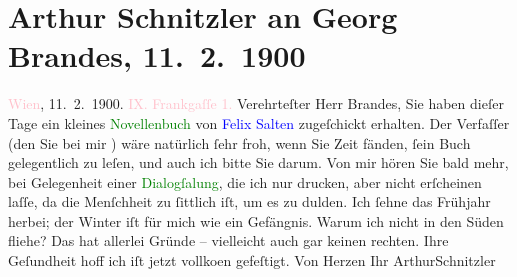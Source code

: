 

               \section[Arthur Schnitzler an Georg Brandes, 11. 2. 1900]{ Arthur Schnitzler an Georg Brandes, 11. 2. 1900}\nopagebreak{}\rehead{ }\normalsize\beginnumbering{} \toendnotes[C]{\smallbreak\pagebreak[2]} 
\toendnotes[C]{\smallbreak}\pstart
           \raggedleft{}{\pb}\textcolor{pink}{Wien}{}\ledrightnote{\textcolor{pink}{Wien}}, 11. 2. 1900.\pend
           \pstart
           \textcolor{pink}{IX. Frankgaſſe 1.}{}\ledrightnote{\textcolor{pink}{Frankgasse}}\pend
           \pstart
           Verehrteſter Herr Brandes, Sie haben dieſer Tage ein kleines
                        \textcolor{green}{Novellenbuch}{} von \textcolor{blue}{Felix Salten}{}\ledrightnote{\textcolor{blue}{Felix Salten}} zugeſchickt erhalten. Der
                    Verfaſſer (den Sie bei mir \label{K_L01012_1v}\label{K_L01012_1h}) wäre natürlich ſehr froh, wenn Sie Zeit fänden, ſein Buch gelegentlich
                    zu leſen, und auch ich bitte Sie darum.\pend
           \pstart
           Von mir hören Sie bald mehr, bei Gelegenheit einer {\pb}\textcolor{green}{Dialogſa{\geminationm}lung}{}, die ich nur drucken, aber nicht
                    erſcheinen laſſe, da die Menſchheit zu ſittlich iſt, um es zu dulden.\pend
           \pstart
           Ich ſehne das Frühjahr herbei; der Winter iſt für mich wie ein Gefängnis. Warum
                    ich nicht in den Süden fliehe? Das hat allerlei Gründe – vielleicht auch gar
                    keinen rechten. Ihre Geſundheit hoff ich iſt jetzt vollko{\geminationm}en gefeſtigt. Von Herzen Ihr
                        \spacefill\mbox{ArthurSchnitzler}\pend
           \endnumbering{}  
      